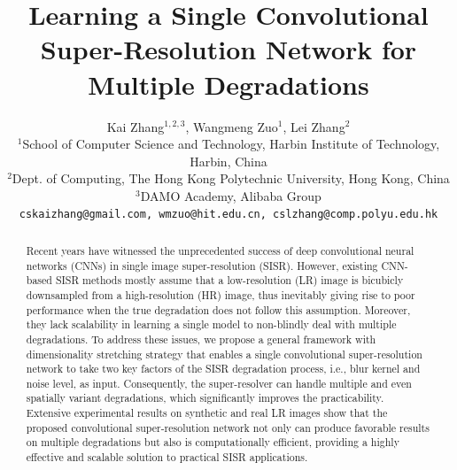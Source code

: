 \documentclass[10pt,twocolumn,letterpaper]{article}
\begin{document}
\title{Learning a Single Convolutional Super-Resolution Network for\\ Multiple Degradations}
\author{Kai Zhang$^{1,2,3}$,  Wangmeng Zuo$^{1}$, Lei Zhang$^2$\\
$^1$School of Computer Science and Technology, Harbin Institute of Technology, Harbin, China\\
$^2$Dept. of Computing, The Hong Kong Polytechnic University, Hong Kong, China\\
$^3$DAMO Academy, Alibaba Group\\
{\tt\small cskaizhang@gmail.com, wmzuo@hit.edu.cn, cslzhang@comp.polyu.edu.hk}
}
\maketitle
\thispagestyle{empty}
\begin{abstract}
Recent years have witnessed the unprecedented success of deep convolutional neural networks (CNNs) in single image super-resolution (SISR).
However, existing CNN-based SISR methods mostly assume that a low-resolution (LR) image is bicubicly downsampled from a high-resolution (HR) image,
thus inevitably giving rise to poor performance when the true degradation does not follow this assumption.
Moreover, they lack scalability in learning a single model to non-blindly deal with multiple degradations. To address these issues, we propose a general framework with dimensionality stretching strategy that enables a single convolutional super-resolution network to take two key factors of the SISR degradation process, i.e., blur kernel and noise level, as input. Consequently, the super-resolver can handle multiple and even spatially variant degradations, which significantly improves the practicability. Extensive experimental results on synthetic and real LR images show that the proposed convolutional super-resolution network not only can produce favorable results on multiple degradations but also is computationally efficient, providing a highly effective and scalable solution to practical SISR applications.

\end{abstract}


\vspace{-0.2cm}
\end{document}
